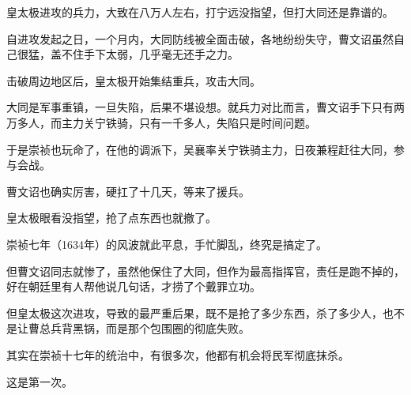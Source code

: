 \begin{multicols}{\theparacolNo}
皇太极进攻的兵力，大致在八万人左右，打宁远没指望，但打大同还是靠谱的。

自进攻发起之日，一个月内，大同防线被全面击破，各地纷纷失守，曹文诏虽然自己很猛，盖不住手下太弱，几乎毫无还手之力。

击破周边地区后，皇太极开始集结重兵，攻击大同。

大同是军事重镇，一旦失陷，后果不堪设想。就兵力对比而言，曹文诏手下只有两万多人，而主力关宁铁骑，只有一千多人，失陷只是时间问题。

于是崇祯也玩命了，在他的调派下，吴襄率关宁铁骑主力，日夜兼程赶往大同，参与会战。

曹文诏也确实厉害，硬扛了十几天，等来了援兵。

皇太极眼看没指望，抢了点东西也就撤了。

崇祯七年（1634年）的风波就此平息，手忙脚乱，终究是搞定了。

但曹文诏同志就惨了，虽然他保住了大同，但作为最高指挥官，责任是跑不掉的，好在朝廷里有人帮他说几句话，才捞了个戴罪立功。

但皇太极这次进攻，导致的最严重后果，既不是抢了多少东西，杀了多少人，也不是让曹总兵背黑锅，而是那个包围圈的彻底失败。

其实在崇祯十七年的统治中，有很多次，他都有机会将民军彻底抹杀。

这是第一次。
\ifnum{}
	\end{multicols}
\fi
\newpage
